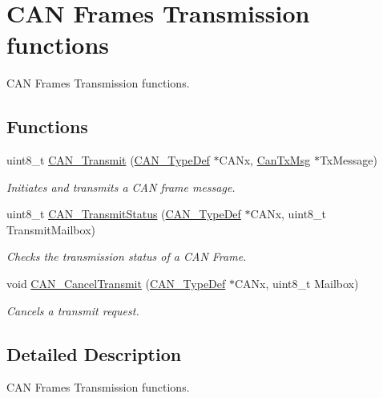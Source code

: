 \hypertarget{group___c_a_n___group2}{}\section{C\+A\+N Frames Transmission functions}
\label{group___c_a_n___group2}


C\+A\+N Frames Transmission functions.  


\subsection*{Functions}
\begin{DoxyCompactItemize}
\item 
uint8\+\_\+t \hyperlink{group___c_a_n___group2_gaccfcb81f76f58400077c7b2d8641dd83}{C\+A\+N\+\_\+\+Transmit} (\hyperlink{struct_c_a_n___type_def}{C\+A\+N\+\_\+\+Type\+Def} $\ast$C\+A\+Nx, \hyperlink{struct_can_tx_msg}{Can\+Tx\+Msg} $\ast$Tx\+Message)
\begin{DoxyCompactList}\small\item\em Initiates and transmits a C\+A\+N frame message. \end{DoxyCompactList}\item 
uint8\+\_\+t \hyperlink{group___c_a_n___group2_ga68ab05a0a6cdfcc2b6f6b6b2c10848e2}{C\+A\+N\+\_\+\+Transmit\+Status} (\hyperlink{struct_c_a_n___type_def}{C\+A\+N\+\_\+\+Type\+Def} $\ast$C\+A\+Nx, uint8\+\_\+t Transmit\+Mailbox)
\begin{DoxyCompactList}\small\item\em Checks the transmission status of a C\+A\+N Frame. \end{DoxyCompactList}\item 
void \hyperlink{group___c_a_n___group2_ga81106cdf5395a1947bfc87ec1685829e}{C\+A\+N\+\_\+\+Cancel\+Transmit} (\hyperlink{struct_c_a_n___type_def}{C\+A\+N\+\_\+\+Type\+Def} $\ast$C\+A\+Nx, uint8\+\_\+t Mailbox)
\begin{DoxyCompactList}\small\item\em Cancels a transmit request. \end{DoxyCompactList}\end{DoxyCompactItemize}


\subsection{Detailed Description}
C\+A\+N Frames Transmission functions. 

